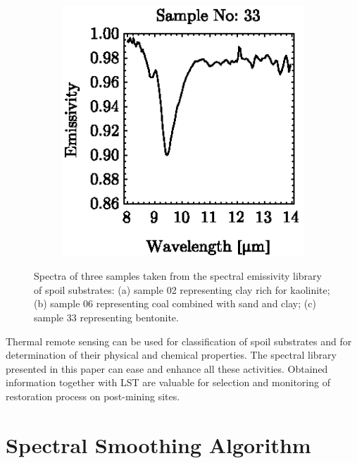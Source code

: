 \begin{figure}[!t]
\begin{subfigure}[t]{.3\linewidth}
		\includegraphics[scale=1]{pics/Chapter_05/Sample_no_33.eps}
		\caption{}
	\end{subfigure}
	\vspace{1.5 em}
	\caption{Spectra of three samples taken from the spectral emissivity library of spoil substrates: (a) sample 02 representing clay rich for kaolinite; (b) sample 06 representing coal combined with sand and clay; (c) sample 33 representing bentonite. }
	\label{fig:SpectraPreview}
\end{figure}

Thermal remote sensing can be used for classification of spoil substrates and for determination of their physical and chemical properties. The spectral library presented in this paper can ease and enhance all these activities. Obtained information together with LST are valuable for selection and monitoring of restoration process on post-mining sites.

\section{Spectral Smoothing Algorithm}


